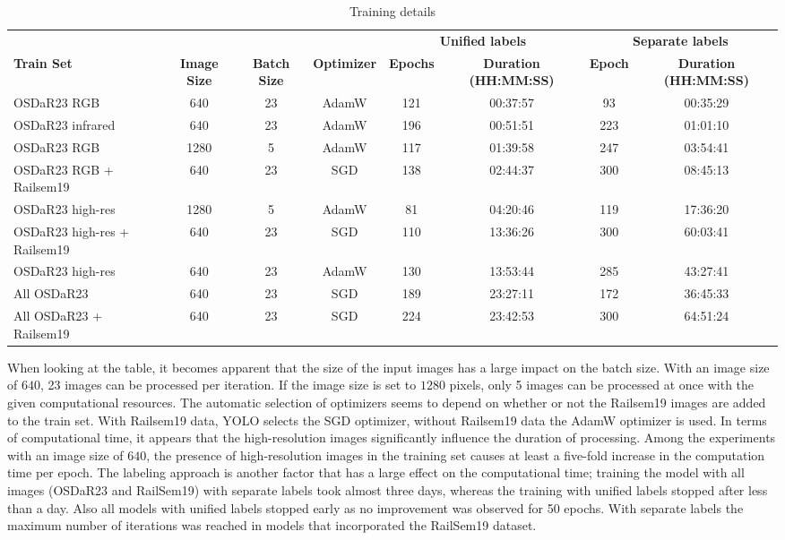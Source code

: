 \documentclass[Master,MDS,english]{BASE/twbook} %
\begin{document}
 
\begin{table}[htbp]
    \centering
    \tiny
    \begin{tabular}{|l|c|c|c|c|c|c|c|}
    \hline
    &  &  & & \multicolumn{2}{c|}{\textbf{Unified labels}}   & \multicolumn{2}{c|}{\textbf{Separate labels}}   \\ \cline{5-8}
    \textbf{Train Set} & \textbf{Image Size} & \textbf{Batch Size} & \textbf{Optimizer} & \textbf{Epochs} & \textbf{Duration (HH:MM:SS)} & \textbf{Epoch} & \textbf{Duration (HH:MM:SS)} \\
    \hline
    OSDaR23 RGB & 640 & 23 & AdamW & 121 & 00:37:57 & 93 & 00:35:29 \\
    OSDaR23 infrared & 640 & 23 & AdamW & 196 & 00:51:51 & 223 & 01:01:10 \\
    OSDaR23 RGB & 1280 & 5 & AdamW & 117 & 01:39:58 & 247 & 03:54:41 \\
    OSDaR23 RGB + Railsem19 & 640 & 23 & SGD & 138 & 02:44:37 & 300 & 08:45:13 \\
    OSDaR23 high-res & 1280 & 5 & AdamW & 81 & 04:20:46 & 119 & 17:36:20 \\
    OSDaR23 high-res + Railsem19 & 640 & 23 & SGD & 110 & 13:36:26 & 300 & 60:03:41 \\
    OSDaR23 high-res & 640 & 23 & AdamW & 130 & 13:53:44 & 285 & 43:27:41 \\
    All OSDaR23 & 640 & 23 & SGD & 189 & 23:27:11 & 172 & 36:45:33 \\
    All OSDaR23 + Railsem19 & 640 & 23 & SGD & 224 & 23:42:53 & 300 & 64:51:24 \\
    \hline
    \end{tabular}
    \caption{Training details}
    \label{tab:training}
\end{table}
 
When looking at the table, it becomes apparent that the size of the input images has a large impact on the batch size. With an image size of $640$, 23 images can be processed per iteration. If the image size is set to $1280$ pixels, only 5 images can be processed at once with the given computational resources. The automatic selection of optimizers seems to depend on whether or not the Railsem19 images are added to the train set. With Railsem19 data, YOLO selects the SGD optimizer, without Railsem19 data the AdamW optimizer is used.   
In terms of computational time, it appears that the high-resolution images significantly influence the duration of processing. Among the experiments with an image size of $640$, the presence of high-resolution images in the training set causes at least a five-fold increase in the computation time per epoch. The labeling approach is another factor that has a large effect on the computational time; training the model with all images (OSDaR23 and RailSem19) with separate labels took almost three days, whereas the training with unified labels stopped after less than a day.
Also all models with unified labels stopped early as no improvement was observed for 50 epochs. With separate labels  the maximum number of iterations was reached in models that incorporated the RailSem19 dataset. 
\end{document}
